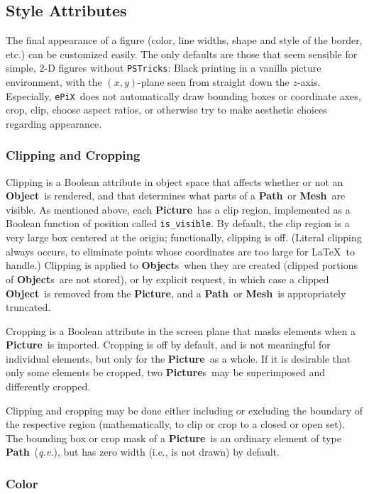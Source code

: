 \documentclass[12pt]{article}
\newcommand{\Class}[1]{\textbf{#1}}
\newcommand{\Program}[1]{\texttt{#1}}
\newcommand{\Mesh}{\Class{Mesh}}
\newcommand{\Object}{\Class{Object}}
\newcommand{\Objects}{\Class{Object}s}
\newcommand{\Path}{\Class{Path}}
\newcommand{\Picture}{\Class{Picture}}
\newcommand{\Pictures}{\Class{Picture}s}
\newcommand{\ePiX}{\Program{ePiX}}
\begin{document}
\subsection{Style Attributes}

The final appearance of a figure (color, line widths, shape and style
of the border, etc.) can be customized easily. The only defaults are
those that seem sensible for simple, 2-D figures without
\texttt{PSTricks}: Black printing in a vanilla picture environment,
with the $(x,y)$-plane seen from straight down the $z$-axis.
Especially, \ePiX\ does not automatically draw bounding boxes or
coordinate axes, crop, clip, choose aspect ratios, or otherwise try to
make aesthetic choices regarding appearance.

\subsubsection*{Clipping and Cropping}

Clipping is a Boolean attribute in object space that affects whether
or not an \Object\ is rendered, and that determines what parts of a
\Path~or \Mesh\ are visible. As mentioned above, each \Picture\ has a
clip region, implemented as a Boolean function of position called
\verb+is_visible+. By default, the clip region is a very large box
centered at the origin; functionally, clipping is off.  (Literal
clipping always occurs, to eliminate points whose coordinates are too
large for \LaTeX\ to handle.)  Clipping is applied to \Objects\ when
they are created (clipped portions of \Objects\ are not stored), or by
explicit request, in which case a clipped \Object\ is removed from the
\Picture, and a \Path~or \Mesh\ is appropriately truncated.

Cropping is a Boolean attribute in the screen plane that masks
elements when a \Picture\ is imported. Cropping is off by default, and
is not meaningful for individual elements, but only for the \Picture\ 
as a whole. If it is desirable that only some elements be cropped, two
\Pictures\ may be superimposed and differently cropped.

Clipping and cropping may be done either including or excluding the
boundary of the respective region (mathematically, to clip or crop to
a closed or open set).  The bounding box or crop mask of a \Picture\ 
is an ordinary element of type \Path\ (\emph{q.v.}), but has zero
width (i.e., is not drawn) by default.

\subsubsection*{Color}
\end{document}
